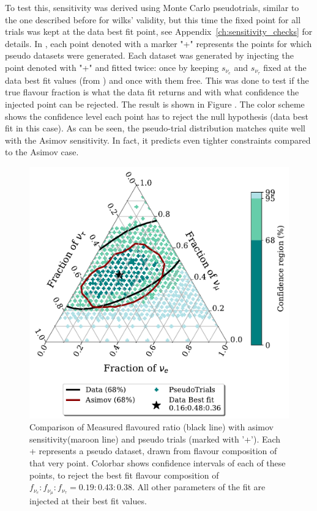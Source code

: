 To test this, sensitivity was derived using Monte Carlo pseudotrials, similar to the one described before for wilks' validity, but this time the fixed point for all trials was kept at the data best fit point, see Appendix~\ref{ch:sensitivity_checks} for details. In , each point denoted with a marker "+" represents the points for which pseudo datasets were generated. Each dataset was generated by injecting the point denoted with "+" and fitted twice: once by keeping $s_{\nu_{e}}$ and $s_{\nu_{\tau}}$ fixed at the data best fit values (from ) and once with them free. This was done to test if the true flavour fraction is what the data fit returns and with what confidence the injected point can be rejected. The result is shown in Figure . The color scheme shows the confidence level each point has to reject the null hypothesis (data best fit in this case). As can be seen, the pseudo-trial distribution matches quite well with the Asimov sensitivity. In fact, it predicts even tighter constraints compared to the Asimov case.

\begin{figure}[h]
    
    \includegraphics{./figures/results/PE_data_asimov_68.pdf}


    \caption[Comparison of Measured flavoured ratio with asimov sensitivity and pseudo trials]{Comparison of Measured flavoured ratio (black line) with asimov sensitivity(maroon line) and pseudo trials (marked with '+'). Each + represents a pseudo dataset, drawn from flavour composition of that very point. Colorbar shows confidence intervals of each of these points, to reject the best fit flavour composition of $f_{\nu_e}:f_{\nu_{\mu}}:f_{\nu_{\tau}} = 0.19:0.43:0.38$. All other parameters of the fit are injected at their best fit values.}
\end{figure}

